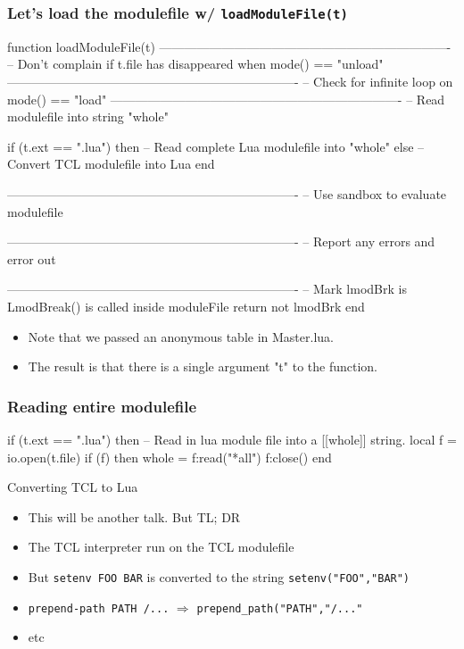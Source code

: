 \documentclass{beamer}
\begin{document}
\begin{frame}[fragile]
    \frametitle{Let's load the modulefile w/ \texttt{loadModuleFile(t)}}
 {\tiny
    \begin{semiverbatim}
function loadModuleFile(t)
   ----------------------------------------------------------------------
   -- Don't complain if t.file has disappeared when mode() == "unload"
   ----------------------------------------------------------------------
   -- Check for infinite loop on mode() == "load"
   ----------------------------------------------------------------------
   -- Read modulefile into string "whole"

   if (t.ext == ".lua") then
      -- Read complete Lua modulefile into "whole"
   else
      -- Convert TCL modulefile into Lua
   end

   ----------------------------------------------------------------------
   -- Use sandbox to evaluate modulefile

   ----------------------------------------------------------------------
   -- Report any errors and error out

   ----------------------------------------------------------------------
   -- Mark lmodBrk is LmodBreak() is called inside moduleFile
   return not lmodBrk
end
    \end{semiverbatim}
}
  \begin{itemize}
    \item Note that we passed an anonymous table in Master.lua.   
    \item The result is that there is a single argument "t" to the function.
  \end{itemize}

\begin{frame}[fragile]
    \frametitle{Reading entire modulefile}
 {\tiny
    \begin{semiverbatim}
    if (t.ext == ".lua") then
      -- Read in lua module file into a [[whole]] string.
      local f = io.open(t.file)
      if (f) then
         whole = f:read("*all")
         f:close()
      end
   \end{semiverbatim}
}
\end{frame}

\begin{frame}{Converting TCL to Lua} 
  \begin{itemize}
    \item This will be another talk. But TL; DR
    \item The TCL interpreter run on the TCL modulefile
    \item But \texttt{setenv FOO BAR} is converted to the string
      \texttt{setenv("FOO","BAR")}
    \item \texttt{prepend-path PATH /...} $\Rightarrow$
      \texttt{prepend_path("PATH","/..."}
    \item etc
  \end{itemize}
\end{frame}


\end{frame}
\end{document}
